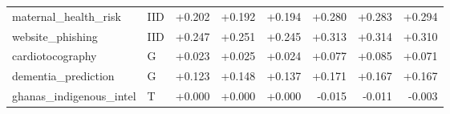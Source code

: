 \begin{longtable}{@{}p{3.95cm}lrrrrrr@{}}
maternal\_\allowbreak{}health\_\allowbreak{}risk & IID & +0.202 & +0.192 & +0.194 & +0.280 & +0.283 & +0.294\\
website\_\allowbreak{}phishing & IID & +0.247 & +0.251 & +0.245 & +0.313 & +0.314 & +0.310\\
cardiotocography & G & +0.023 & +0.025 & +0.024 & +0.077 & +0.085 & +0.071\\
dementia\_\allowbreak{}prediction & G & +0.123 & +0.148 & +0.137 & +0.171 & +0.167 & +0.167\\
ghanas\_\allowbreak{}indigenous\_\allowbreak{}intel & T & +0.000 & +0.000 & +0.000 & -0.015 & -0.011 & -0.003\\
\end{longtable}\endgroup
\begingroup\footnotesize\setlength{\tabcolsep}{3pt}\renewcommand{\arraystretch}{1.15}
\setlength\LTleft{0pt}\setlength\LTright{0pt}
